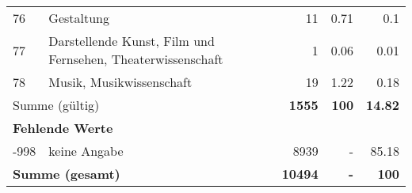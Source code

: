 \begin{longtable}{lXrrr}
        76 & \multicolumn{1}{X}{Gestaltung} & %
          \num{11} &
          \num[round-mode=places,round-precision=2]{0,71} &
          \num[round-mode=places,round-precision=2]{0,1} \\

        77 & \multicolumn{1}{X}{Darstellende Kunst, Film und Fernsehen, Theaterwissenschaft} & %
          \num{1} &
          \num[round-mode=places,round-precision=2]{0,06} &
          \num[round-mode=places,round-precision=2]{0,01} \\

        78 & \multicolumn{1}{X}{Musik, Musikwissenschaft} & %
          \num{19} &
          \num[round-mode=places,round-precision=2]{1,22} &
          \num[round-mode=places,round-precision=2]{0,18} \\

     \midrule
     \multicolumn{2}{l}{Summe (gültig)} &
       \textbf{\num{1555}} &
     \textbf{100} &
       \textbf{\num[round-mode=places,round-precision=2]{14,82}} \\
     \multicolumn{5}{l}{\textbf{Fehlende Werte}}\\
       -998 &
       keine Angabe &
         \num{8939} &
        - &
         \num[round-mode=places,round-precision=2]{85,18} \\
     \midrule
     \multicolumn{2}{l}{\textbf{Summe (gesamt)}} &
          \textbf{\num{10494}} &
        \textbf{-} &
        \textbf{100} \\
     \bottomrule
     \end{longtable}
     
